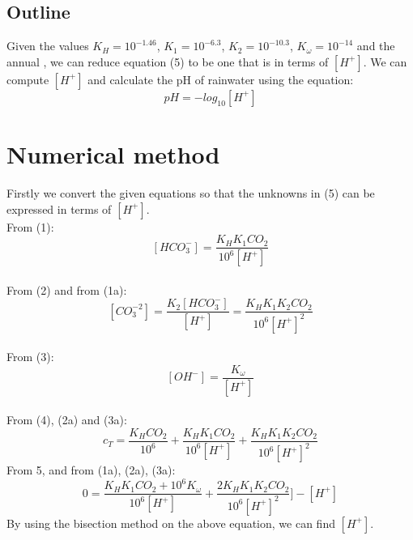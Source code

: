\documentclass{article}
\begin{document}
	\subsection{Outline}
	Given the values ${K_H  = 10^{-1.46}}$, ${ K_1 =  10^{-6.3}}$, ${ K_2 = 10^{-10.3}}$, ${ K_\omega = 10^{-14}}$ and the annual , we can reduce equation (5) to be one that is in terms of ${[H^+]}$. We can compute ${[H^+]}$ and calculate the pH of rainwater using the equation:
	\[ pH = -log_{10}[H^+] \tag{6} \]
	
	\section{Numerical method}
	Firstly we convert the given equations so that the unknowns in (5) can be expressed in terms of ${[H^+]}$. \\
	From (1):
	\[ [HCO_3^-] = \frac{K_HK_1CO_2}{10^6[H^+]} \tag{1a} \] \\
	From (2) and from (1a):
	\[ [CO_3^{-2}] = \frac{K_2[HCO_3^-]}{[H^+]} \tag{2a} = \frac{K_HK_1K_2CO_2}{10^6[H^+]^2} \] \\
	From (3):
	\[ [OH^-] = \frac{K_\omega}{[H^+]} \tag{3a} \] \\
	From (4), (2a) and (3a):
	\[ c_T = \frac{K_HCO_2}{10^6} + \frac{K_HK_1CO_2}{10^6[H^+]} + \frac{K_HK_1K_2CO_2}{10^6[H^+]^2} \tag{4a} \]
	From 5, and from (1a), (2a), (3a):
	\[ 0 =  \frac{K_HK_1CO_2 + 10^6K_\omega}{10^6[H^+]} + \frac{2K_HK_1K_2CO_2}{10^6[H^+]^2}] - [H^+] \tag{5a} \]
	By using the bisection method on the above equation, we can find ${[H^+]}$.
\end{document}
